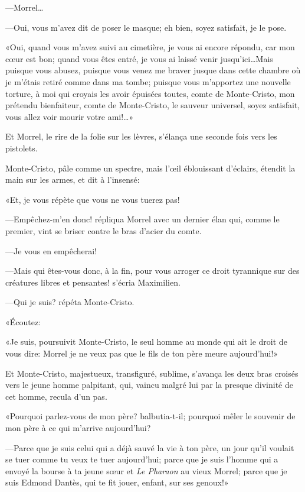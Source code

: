 —Morrel\dots 

—Oui, vous m'avez dit de poser le masque; eh bien, soyez satisfait, je le pose. 

«Oui, quand vous m'avez suivi au cimetière, je vous ai encore répondu, car mon cœur est bon; quand vous êtes entré, je vous ai laissé venir jusqu'ici\dots Mais puisque vous abusez, puisque vous venez me braver jusque dans cette chambre où je m'étais retiré comme dans ma tombe; puisque vous m'apportez une nouvelle torture, à moi qui croyais les avoir épuisées toutes, comte de Monte-Cristo, mon prétendu bienfaiteur, comte de Monte-Cristo, le sauveur universel, soyez satisfait, vous allez voir mourir votre ami!\dots» 

Et Morrel, le rire de la folie sur les lèvres, s'élança une seconde fois vers les pistolets. 

Monte-Cristo, pâle comme un spectre, mais l'œil éblouissant d'éclairs, étendit la main sur les armes, et dit à l'insensé: 

«Et, je vous répète que vous ne vous tuerez pas! 

—Empêchez-m'en donc! répliqua Morrel avec un dernier élan qui, comme le premier, vint se briser contre le bras d'acier du comte. 

—Je vous en empêcherai! 

—Mais qui êtes-vous donc, à la fin, pour vous arroger ce droit tyrannique sur des créatures libres et pensantes! s'écria Maximilien. 

—Qui je suis? répéta Monte-Cristo. 

«Écoutez: 

«Je suis, poursuivit Monte-Cristo, le seul homme au monde qui ait le droit de vous dire: Morrel je ne veux pas que le fils de ton père meure aujourd'hui!» 

Et Monte-Cristo, majestueux, transfiguré, sublime, s'avança les deux bras croisés vers le jeune homme palpitant, qui, vaincu malgré lui par la presque divinité de cet homme, recula d'un pas. 

«Pourquoi parlez-vous de mon père? balbutia-t-il; pourquoi mêler le souvenir de mon père à ce qui m'arrive aujourd'hui? 

—Parce que je suis celui qui a déjà sauvé la vie à ton père, un jour qu'il voulait se tuer comme tu veux te tuer aujourd'hui; parce que je suis l'homme qui a envoyé la bourse à ta jeune sœur et \textit{Le Pharaon} au vieux Morrel; parce que je suis Edmond Dantès, qui te fit jouer, enfant, sur ses genoux!» 

